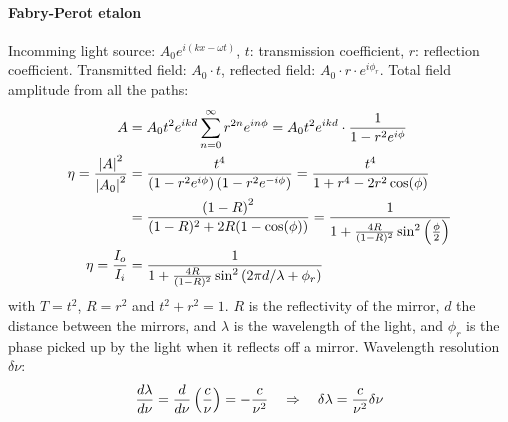 \paragraph{Fabry-Perot etalon}
Incomming light source: $A_0 e^{i(k x - \omega t)}$, $t$: transmission coefficient,
$r$: reflection coefficient. Transmitted field: $A_0 \cdot t$, reflected field:
$A_0 \cdot r \cdot e^{i \phi_r}$. Total field amplitude from all the paths:
\begin{align*}
    A &= A_0 t^2 e^{i k d} \sum_{n=0}^\infty r^{2n} e^{i n \phi}
    = A_0 t^2 e^{i k d} \cdot \frac{1}{1 - r^2 e^{i \phi}}
    \\
    \eta = \frac{\left\vert A \right\vert^2}{\left\vert A_0 \right\vert^2} &= \frac{t^4}{\left( 1 - r^2 e^{i \phi} \right) \left( 1 - r^2 e^{-i \phi} \right)}
        = \frac{t^4}{1 + r^4 - 2 r^2 \cos(\phi)} 
    \\
    &= \frac{\left( 1-R \right)^2}{(1-R)^2 + 2 R (1-\cos(\phi))}
        = \frac{1}{1 + \frac{4 R}{(1-R)^2} \sin^2 \left( \frac{\phi}{2} \right)}
    \\
    \eta = \frac{I_o}{I_i} &= \frac{1}{1+ \frac{4 R}{(1-R)^2} \sin^2 \left( 2 \pi d / \lambda + \phi_r \right)}
\end{align*}
with $T = t^2$, $R = r^2$ and $t^2 + r^2 = 1$. $R$ is the reflectivity of the
mirror, $d$ the distance between the mirrors, and $\lambda$ is the wavelength
of the light, and $\phi_r$ is the phase picked up by the light when it reflects off
a mirror.
Wavelength resolution $\delta \nu$:
\begin{align*}
    \frac{d \lambda}{d \nu} = \frac{d}{d \nu} \left( \frac{c}{\nu} \right) = - \frac{c}{\nu^2}
    \hspace{10pt} \Rightarrow \hspace{10pt}
    \delta \lambda = \frac{c}{\nu^2} \delta \nu
\end{align*}

